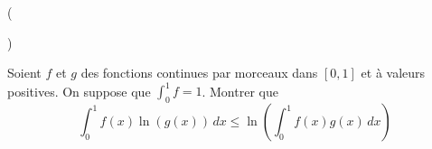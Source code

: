 \begin{tiny}()\end{tiny} Soient $f$ et $g$ des fonctions continues par morceaux dans $[0,1]$ et à valeurs positives. On suppose que $\int_0^1f = 1$. Montrer que 
\begin{displaymath}
 \int_0^1f(x)\ln(g(x))\,dx \leq \ln\left(\int_0^1f(x)g(x)\,dx \right) 
\end{displaymath}
 